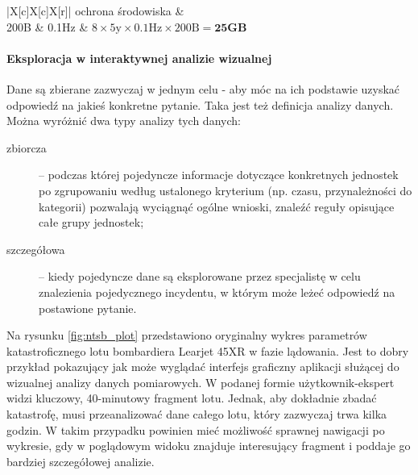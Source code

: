 \begin{table}[H]
\begin{tabu}{|X[c]X[c]X[r]|}
		ochrona środowiska                   &                                                                                \\
		200B                                 & 0.1Hz                                                       & $8 \times 5\mbox{y} \times 0.1\mbox{Hz} \times 200\mbox{B} = \textbf{25GB}$       \\ \hline
	\end{tabu}
	\caption{Przykłady danych pomiarowych}
	\label{table:measurementDataExamples}
\end{table}

\paragraph{Eksploracja w interaktywnej analizie wizualnej}
Dane są zbierane zazwyczaj w jednym celu - aby móc na ich podstawie uzyskać odpowiedź na jakieś konkretne pytanie. Taka jest też definicja analizy danych.
Można wyróżnić dwa typy analizy tych danych:
\begin{description}
	\item[zbiorcza]-- podczas której pojedyncze informacje dotyczące konkretnych jednostek po zgrupowaniu według ustalonego kryterium (np. czasu, przynależności do kategorii) pozwalają wyciągnąć ogólne wnioski, znaleźć reguły opisujące całe grupy jednostek;
	
	\item[szczegółowa]-- kiedy pojedyncze dane są eksplorowane przez specjalistę w celu znalezienia pojedycznego incydentu, w którym może leżeć odpowiedź na postawione pytanie.
\end{description}

Na rysunku \ref{fig:ntsb_plot} przedstawiono oryginalny wykres parametrów katastroficznego lotu bombardiera Learjet 45XR w fazie lądowania.
Jest to dobry przykład pokazujący jak może wyglądać interfejs graficzny aplikacji służącej do wizualnej analizy danych pomiarowych.
W podanej formie użytkownik-ekspert widzi kluczowy, 40-minutowy fragment lotu.
Jednak, aby dokładnie zbadać katastrofę, musi przeanalizować dane całego lotu, który zazwyczaj trwa kilka godzin.
W takim przypadku powinien mieć możliwość sprawnej nawigacji po wykresie, gdy w poglądowym widoku znajduje interesujący fragment i poddaje go bardziej szczegółowej analizie.

